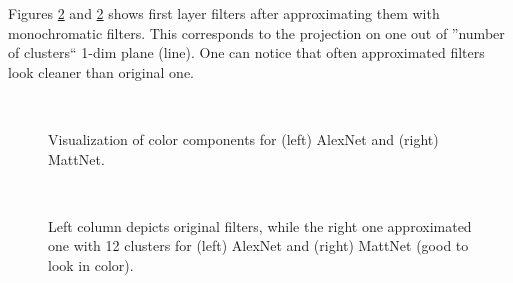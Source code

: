 Figures \ref{denoising} and \ref{denoising} shows first layer filters after approximating them 
with monochromatic filters. This corresponds to the projection on one out of ''number of clusters`` 1-dim plane (line).
One can notice that often approximated filters look cleaner than original one.


\begin{figure}[t]
\mbox{
  \quad
{}
}
\label{components}
\caption{Visualization of color components for (left) AlexNet and (right) MattNet.}
\end{figure}


\begin{figure}[t]
\mbox{
  \quad
{}
}
\label{denoising}
\caption{Left column depicts original filters, while the right one approximated one with 12 clusters for (left) AlexNet and (right) MattNet (good to look in color). }
\end{figure}


